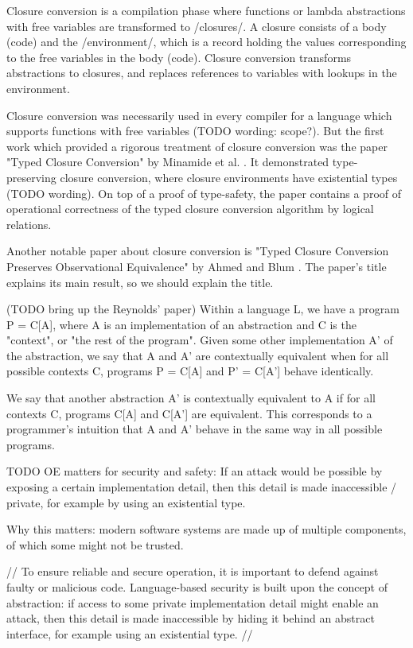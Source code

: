 \documentclass[bsc,frontabs,twoside,singlespacing,parskip,deptreport]{infthesis}
\theoremstyle{definition}
\begin{document}
Closure conversion is a compilation phase where functions or lambda
abstractions with free variables are transformed to /closures/. A
closure consists of a body (code) and the /environment/, which is a
record holding the values corresponding to the free variables in the
body (code). Closure conversion transforms abstractions to closures,
and replaces references to variables with lookups in the environment.

Closure conversion was necessarily used in every compiler for a
language which supports functions with free variables (TODO wording:
scope?). But the first work which provided a rigorous treatment of
closure conversion was the paper "Typed Closure Conversion" by
Minamide et al. \cite{TODO}. It demonstrated type-preserving closure
conversion, where closure environments have existential types (TODO
wording). On top of a proof of type-safety, the paper contains a proof
of operational correctness of the typed closure conversion algorithm
by logical relations.

Another notable paper about closure conversion is "Typed Closure
Conversion Preserves Observational Equivalence" by Ahmed and Blum
\cite{TODO}. The paper's title explains its main result, so we should
explain the title.

(TODO bring up the Reynolds' paper) Within a language L, we have a
program P = C[A], where A is an implementation of an abstraction and C
is the "context", or "the rest of the program". Given some other
implementation A' of the abstraction, we say that A and A' are
contextually equivalent when for all possible contexts C, programs P =
C[A] and P' = C[A'] behave identically.

We say that another abstraction A' is contextually equivalent to A if
for all contexts C, programs C[A] and C[A'] are equivalent. This
corresponds to a programmer's intuition that A and A' behave in the
same way in all possible programs.

TODO OE matters for security and safety: If an attack would be
possible by exposing a certain implementation detail, then this detail
is made inaccessible / private, for example by using an existential
type.

Why this matters: modern software systems are made up of multiple
components, of which some might not be trusted.

// To ensure reliable and secure operation, it is important to defend
against faulty or malicious code. Language-based security is built
upon the concept of abstraction: if access to some private
implementation detail might enable an attack, then this detail is made
inaccessible by hiding it behind an abstract interface, for example
using an existential type. //
\end{document}
